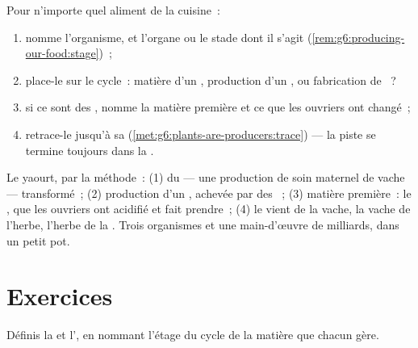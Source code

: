 \begin{method}\label{met:g6:producing-our-food:read}
Pour n'importe quel aliment de la cuisine~:
\begin{enumerate}
  \item nomme l'organisme, et l'organe ou le stade dont il s'agit
        (\cref{rem:g6:producing-our-food:stage})~;
  \item place-le sur le cycle~: matière d'un , production
        d'un , ou fabrication de ~?
  \item si ce sont des , nomme la matière première et ce
        que les ouvriers ont changé~;
  \item retrace-le jusqu'à sa 
        (\cref{met:g6:plants-are-producers:trace}) --- la piste se
        termine toujours dans la .
\end{enumerate}
\end{method}

\begin{example}\label{ex:g6:producing-our-food:breakfast}
Le yaourt, par la méthode~: (1) du  --- une production de soin
maternel de vache --- transformé~; (2) production d'un ,
achevée par des ~; (3) matière première~: le , que les
ouvriers ont acidifié et fait prendre~; (4) le  vient de la
vache, la vache de l'herbe, l'herbe de la . Trois organismes
et une main-d'œuvre de milliards, dans un petit pot.
\end{example}

\section{Exercices}

\begin{exercise}[$\star$]\label{exo:g6:producing-our-food:1}
Définis la  et l', en nommant l'étage du cycle de la
matière que chacun gère.
\end{exercise}

